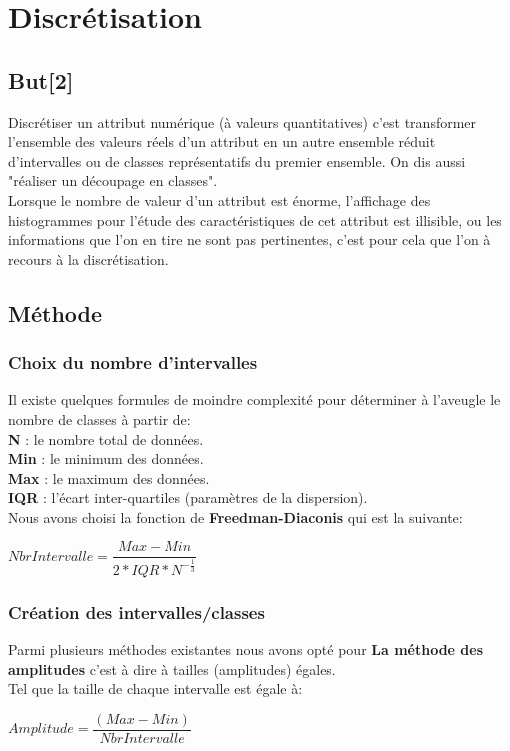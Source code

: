\documentclass[12pt,a4paper,oneside]{book}
\begin{document}
\section{Discrétisation}
\subsection{But[2]}
Discrétiser un attribut numérique (à valeurs quantitatives) c'est transformer l'ensemble des valeurs réels d'un attribut en un autre ensemble réduit d'intervalles ou de classes représentatifs du premier ensemble. On dis aussi "réaliser un découpage en classes". \\
Lorsque le nombre de valeur d'un attribut est énorme, l'affichage des histogrammes pour l'étude des caractéristiques de cet attribut est illisible, ou les informations que l'on en tire ne sont pas pertinentes, c'est pour cela que l'on à recours à la discrétisation.

\subsection{Méthode}
\subsubsection{Choix du nombre d'intervalles}

Il existe quelques formules de moindre complexité pour déterminer à l'aveugle le nombre de classes à partir de:\\
\textbf{N} : le nombre total de données.\\
\textbf{Min} : le minimum des données.\\
\textbf{Max} : le maximum des données.\\
\textbf{IQR} : l'écart inter-quartiles (paramètres de la dispersion).\\

Nous avons choisi la fonction de \textbf{Freedman-Diaconis} qui est la suivante:
\begin{center}
	$NbrIntervalle = \dfrac{Max - Min}{2 * IQR * N^{-\frac{1}{3}}}$
\end{center}

 
\subsubsection{Création des intervalles/classes}

Parmi plusieurs méthodes existantes nous avons opté pour \textbf{ La méthode des amplitudes} c'est à dire à tailles (amplitudes) égales.\\
Tel que la taille de chaque intervalle est égale à:
\begin{center}
	$Amplitude = \dfrac{(Max - Min)}{NbrIntervalle} $\\
\end{center}
\end{document}
